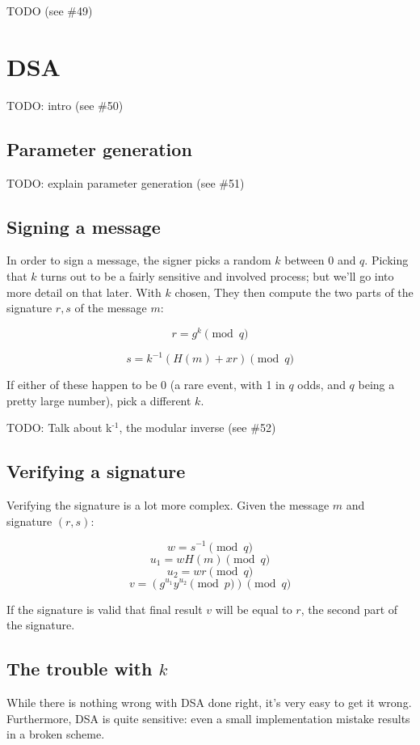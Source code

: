 \documentclass[11pt,ebook,table,dvipsnames]{memoir}
\begin{document}
TODO (see \#49)
\section{DSA}
\label{sec-2-8-3}

TODO: intro (see \#50)

\subsection{Parameter generation}
\label{sec-2-8-3-1}

TODO: explain parameter generation (see \#51)
\subsection{Signing a message}
\label{sec-2-8-3-2}

In order to sign a message, the signer picks a random $k$ between 0
and $q$. Picking that $k$ turns out to be a fairly sensitive and
involved process; but we'll go into more detail on that later. With
$k$ chosen, They then compute the two parts of the signature $r, s$
of the message $m$:

\[
r = g^k \pmod q
\]

\[
s = k^{-1} (H(m) + xr) \pmod q
\]

If either of these happen to be 0 (a rare event, with 1 in $q$ odds,
and $q$ being a pretty large number), pick a different $k$.

TODO: Talk about k$^{\text{-1}}$, the modular inverse (see \#52)
\subsection{Verifying a signature}
\label{sec-2-8-3-3}

Verifying the signature is a lot more complex. Given the message $m$
and signature $(r, s)$:

\[
w = s^{-1} \pmod q
\]
\[
u_1 = wH(m) \pmod q
\]
\[
u_2 = wr \pmod q
\]
\[
v = (g^{u_1}y^{u_2} \pmod p) \pmod q
\]

If the signature is valid that final result $v$ will be equal to $r$,
the second part of the signature.
\subsection{The trouble with $k$}
\label{sec-2-8-3-4}

While there is nothing wrong with DSA done right, it's very easy to
get it wrong. Furthermore, DSA is quite sensitive: even a small
implementation mistake results in a broken scheme.
\end{document}
